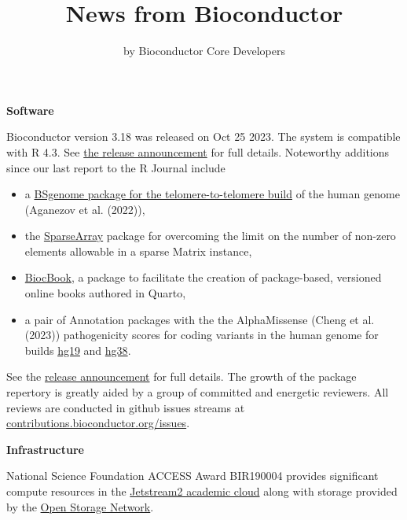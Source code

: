\title{News from Bioconductor}


\author{by Bioconductor Core Developers}

\maketitle


\textbf{Software}

Bioconductor version 3.18 was released on Oct 25 2023. The system is compatible with R 4.3. See \href{https://bioconductor.org/news/bioc_3_18_release/}{the release announcement} for full details. Noteworthy additions since our last report to the R Journal include

\begin{itemize}
\tightlist
\item
  a \href{https://bioconductor.org/packages/release/data/annotation/html/BSgenome.Hsapiens.NCBI.T2T.CHM13v2.0.html}{BSgenome package for the telomere-to-telomere build} of the
  human genome (Aganezov et al. (2022)),
\item
  the \href{https://bioconductor.org/packages/release/bioc/html/SparseArray.html}{SparseArray} package for overcoming the limit on the number of non-zero elements allowable in a sparse Matrix instance,
\item
  \href{https://bioconductor.org/packages/BiocBook}{BiocBook}, a package to facilitate the creation of package-based, versioned online books authored in Quarto,
\item
  a pair of Annotation packages with the the AlphaMissense (Cheng et al. (2023)) pathogenicity scores
  for coding variants in the human genome for builds \href{https://bioconductor.org/packages/AlphaMissense.v2023.hg19}{hg19} and
  \href{https://bioconductor.org/packages/AlphaMissense.v2023.hg38}{hg38}.
\end{itemize}

See the \href{https://bioconductor.org/news/bioc_3_18_release/}{release announcement} for full details.
The growth of the package repertory is greatly aided by a group of committed
and energetic reviewers. All reviews are conducted in github issues streams
at \href{https://github.com/Bioconductor/Contributions/issues}{contributions.bioconductor.org/issues}.

\textbf{Infrastructure}

National Science Foundation ACCESS Award BIR190004 provides
significant compute resources in the \href{https://jetstream-cloud.org/index.html}{Jetstream2 academic cloud} along with storage provided by the \href{https://www.openstoragenetwork.org/}{Open Storage Network}.

